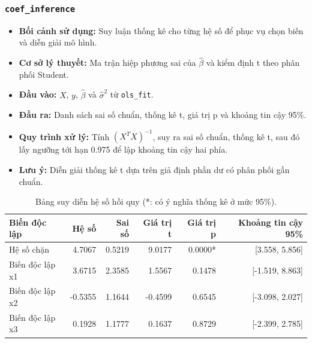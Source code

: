 \documentclass[a4paper]{article}
\newcommand{\code}[1]{\colorbox{light-gray}{\texttt{#1}}}
\begin{document}
\subsubsection{\code{coef\_inference}}
\begin{itemize}[leftmargin=*]
    \item \textbf{Bối cảnh sử dụng:} Suy luận thống kê cho từng hệ số để phục vụ chọn biến và diễn giải mô hình.
    \item \textbf{Cơ sở lý thuyết:} Ma trận hiệp phương sai của $\hat{\beta}$ và kiểm định t theo phân phối Student.
    \item \textbf{Đầu vào:} $X$, $y$, $\hat{\beta}$ và $\hat{\sigma}^2$ từ \texttt{ols\_fit}.
    \item \textbf{Đầu ra:} Danh sách sai số chuẩn, thống kê t, giá trị p và khoảng tin cậy 95\%.
    \item \textbf{Quy trình xử lý:} Tính $(X^T X)^{-1}$, suy ra sai số chuẩn, thống kê t, sau đó lấy ngưỡng tới hạn 0.975 để lập khoảng tin cậy hai phía.
    \item \textbf{Lưu ý:} Diễn giải thống kê t dựa trên giả định phần dư có phân phối gần chuẩn.
\end{itemize}
\begin{table}[H]
    \centering
    \small
    \begin{tabular}{lrrrrr}
    \toprule
    \textbf{Biến độc lập} & \textbf{Hệ số} & \textbf{Sai số} & \textbf{Giá trị t} & \textbf{Giá trị p} & \textbf{Khoảng tin cậy 95\%} \\
    \midrule
    Hệ số chặn & 4.7067 & 0.5219 & 9.0177 & 0.0000* & [3.558, 5.856] \\
    Biến độc lập x1 & 3.6715 & 2.3585 & 1.5567 & 0.1478 & [-1.519, 8.863] \\
    Biến độc lập x2 & -0.5355 & 1.1644 & -0.4599 & 0.6545 & [-3.098, 2.027] \\
    Biến độc lập x3 & 0.1928 & 1.1777 & 0.1637 & 0.8729 & [-2.399, 2.785] \\
    \bottomrule
    \end{tabular}
    \caption{Bảng suy diễn hệ số hồi quy (*: có ý nghĩa thống kê ở mức 95\%).}
\end{table}
\end{document}
